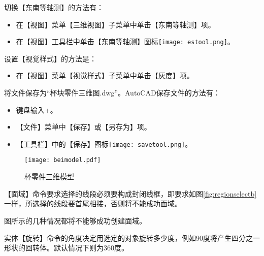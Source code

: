 \begin{procedure}
切换【东南等轴测】的方法有：
\begin{itemize}
\item 在【视图】菜单【三维视图】子菜单中单击【东南等轴测】项。
\item 在【视图】工具栏中单击【东南等轴测】图标\texttt{[image: estool.png]}。
\end{itemize}
设置【视觉样式】的方法是：
\begin{itemize}
\item 在【视图】菜单【视觉样式】子菜单中单击【灰度】项。
\end{itemize}
\item 将文件保存为“杯块零件三维图.dwg”。AutoCAD保存文件的方法有：
\begin{itemize}
\item 键盘输入+。
\item 【文件】菜单中【保存】或【另存为】项。
\item 【工具栏】中的【保存】图标\texttt{[image: savetool.png]}。
\end{itemize}
\end{procedure}
\begin{figure}
\centering
\texttt{[image: beimodel.pdf]}
\caption{杯零件三维模型}\label{fig:beimodel}
\end{figure}

\begin{tips}
\item 【面域】命令要求选择的线段必须要构成封闭线框，即要求如图\ref{fig:regionselectb}一样，所选择的线段要首尾相接，否则将不能成功面域。
\item 图所示的几种情况都将不能够成功创建面域。
\begin{figure}[htbp]
\centering
{}\hspace{20pt}
\hspace{20pt}
\hspace{20pt}
\end{figure}
\item 实体【旋转】命令的角度决定用选定的对象旋转多少度，例如90度将产生四分之一形状的回转体。默认情况下则为360度。
\end{tips}
\endinput